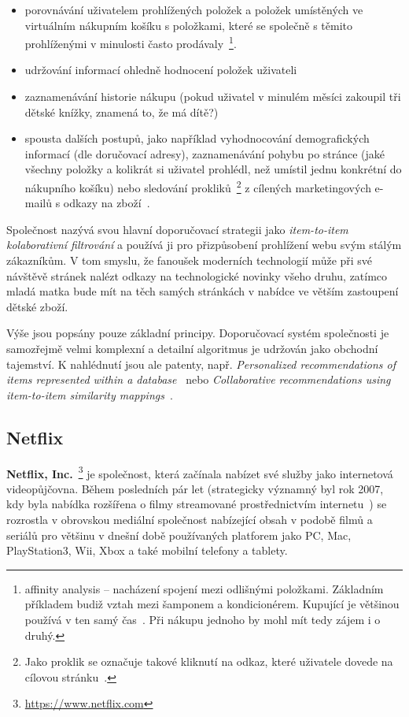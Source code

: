 \documentclass[thesis=M,czech]{FITthesis}[2014/05/07]
\begin{document}
\begin{itemize}
	\item porovnávání uživatelem prohlížených položek a položek umístěných ve virtuálním nákupním košíku s položkami, které se společně s těmito prohlíženými v minulosti často prodávaly~\footnote{affinity analysis – nacházení spojení mezi odlišnými položkami. Základním příkladem budiž vztah mezi šamponem a kondicionérem. Kupující je většinou používá v ten samý čas~\cite{affinity}. Při nákupu jednoho by mohl mít tedy zájem i o druhý.}.
	\item udržování informací ohledně hodnocení položek uživateli
	\item zaznamenávání historie nákupu (pokud uživatel v minulém měsíci zakoupil tři dětské knížky, znamená to, že má dítě?)
	\item spousta dalších postupů, jako například vyhodnocování demografických informací (dle doručovací adresy), zaznamenávání pohybu po stránce (jaké všechny položky a kolikrát si uživatel prohlédl, než umístil jednu konkrétní do nákupního košíku) nebo sledování prokliků~\footnote{Jako proklik se označuje takové kliknutí na odkaz, které uživatele dovede na cílovou stránku~\cite{proklik}.} z cílených marketingových e-mailů s odkazy na zboží~\cite{amazonrec}.
\end{itemize}

Společnost nazývá svou hlavní doporučovací strategii jako \emph{item-to-item kolaborativní filtrování} a používá ji pro přizpůsobení prohlížení webu svým stálým zákazníkům. V tom smyslu, že fanoušek moderních technologií může při své návštěvě stránek nalézt odkazy na technologické novinky všeho druhu, zatímco mladá matka bude mít na těch samých stránkách v nabídce ve větším zastoupení dětské zboží.
 
Výše jsou popsány pouze základní principy. Doporučovací systém společnosti je samozřejmě velmi komplexní a detailní algoritmus je udržován jako obchodní tajemství. K nahlédnutí jsou ale patenty, např. \emph{Personalized recommendations of items represented within a database}~\cite{jacobi2006personalized} nebo \emph{Collaborative recommendations using item-to-item similarity mappings}~\cite{linden2001collaborative}.

\subsection{Netflix}

\textbf{Netflix, Inc.}~\footnote{\url{https://www.netflix.com}} je společnost, která začínala nabízet své služby jako internetová videopůjčovna. Během posledních pár let (strategicky významný byl rok 2007, kdy byla nabídka rozšířena o filmy streamované prostřednictvím internetu~\cite{netflix2007}) se rozrostla v obrovskou mediální společnost nabízející obsah v podobě filmů a seriálů pro většinu v dnešní době používaných platforem jako PC, Mac, PlayStation3, Wii, Xbox a také mobilní telefony a tablety. 
\end{document}
